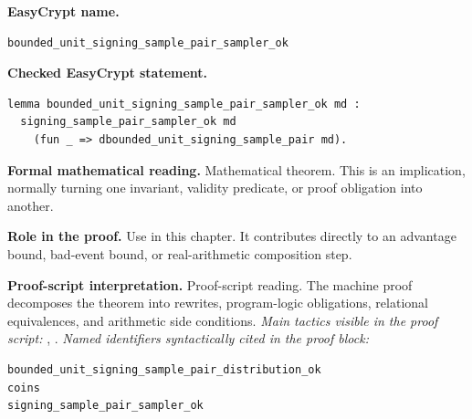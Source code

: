\begin{formaltheorem}
\noindent\textbf{EasyCrypt name.}
\begin{lstlisting}[language=EasyCrypt,basicstyle=\ttfamily\scriptsize]
bounded_unit_signing_sample_pair_sampler_ok
\end{lstlisting}
\noindent\textbf{Checked EasyCrypt statement.}
\begin{lstlisting}[language=EasyCrypt,basicstyle=\ttfamily\scriptsize]
lemma bounded_unit_signing_sample_pair_sampler_ok md :
  signing_sample_pair_sampler_ok md
    (fun _ => dbounded_unit_signing_sample_pair md).
\end{lstlisting}
\noindent\textbf{Formal mathematical reading.}
Mathematical theorem. This is an implication, normally turning one invariant, validity predicate, or proof obligation into another.

\noindent\textbf{Role in the proof.}
Use in this chapter. It contributes directly to an advantage bound, bad-event bound, or real-arithmetic composition step.

\noindent\textbf{Proof-script interpretation.}
Proof-script reading. The machine proof decomposes the theorem into rewrites, program-logic obligations, relational equivalences, and arithmetic side conditions.
\emph{Main tactics visible in the proof script:} , .
\emph{Named identifiers syntactically cited in the proof block:}
\begin{lstlisting}[language=EasyCrypt,basicstyle=\ttfamily\scriptsize]
bounded_unit_signing_sample_pair_distribution_ok
coins
signing_sample_pair_sampler_ok
\end{lstlisting}

\end{formaltheorem}

